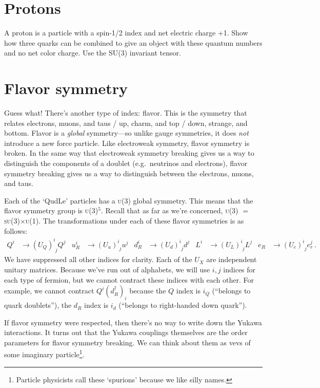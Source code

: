 \documentclass[12pt]{article}
\newcommand{\acro}[1]{\textsc{\MakeLowercase{#1}}}
\numberwithin{equation}{section}    %
\begin{document}
\section{Protons}

A proton is a particle with a spin-1/2 index and net electric charge +1. Show how three quarks can be combined to give an object with these quantum numbers and no net color charge. Use the SU(3) invariant tensor. 

\section{Flavor symmetry}

Guess what! There's another type of index: flavor. This is the symmetry that relates electrons, muons, and taus / up, charm, and top / down, strange, and bottom. Flavor is a \emph{global} symmetry---so unlike gauge symmetries, it does \emph{not} introduce a new force particle. Like electroweak symmetry, flavor symmetry is broken. In the same way that electroweak symmetry breaking gives us a way to distinguish the components of a doublet (e.g.\ neutrinos and electrons), flavor symmetry breaking gives us a way to distinguish between the electrons, muons, and taus. 

Each of the `QudLe' particles has a \acro{U(3)} global symmetry. This means that the flavor symmetry group is \acro{U(3)}$^5$. Recall that as far as we're concerned, \acro{U(3)} $=$ \acro{SU(3)}$\times$\acro{U(1)}. The transformations under each of these flavor symmetries is as follows: 
\begin{align}
	Q^i&\to \left(U_Q\right)^i_{\phantom{i}j} Q^j
	&
	u_R^i&\to \left(U_u\right)^i_{\phantom{i}j} u^j
	&
	d_R^i&\to \left(U_d\right)^i_{\phantom{i}j} d^j
	&
	L^i&\to \left(U_L\right)^i_{\phantom{i}j} L^j
	&
	e_R&\to \left(U_e\right)^i_{\phantom{i}j} e_r^j \ .
\end{align}
We have suppressed all other indices for clarity. Each of the $U_X$ are independent unitary matrices. Because we've run out of alphabets, we will use $i,j$ indices for each type of fermion, but we cannot contract these indices with each other. For example, we cannot contract $Q^i (d_R^\dag)_i$ because the $Q$ index is $i_Q$ (``belongs to quark doublets''), the $d_R$ index is $i_d$ (``belongs to right-handed down quark'').

If flavor symmetry were respected, then there's no way to write down the Yukawa interactions. It turns out that the Yukawa couplings themselves are the order parameters for flavor symmetry breaking. We can think about them as vevs of some imaginary particle\footnote{Particle physicists call these `spurions' because we like silly names.}. 
\end{document}
